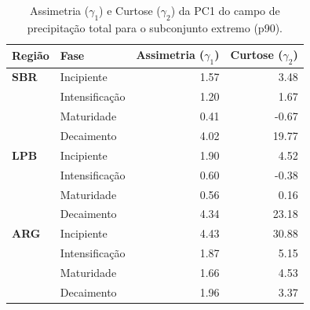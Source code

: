 \begin{table}[htbp]
\centering
\caption[Momentos estatísticos da PC1 de precipitação --- Subconjunto p90]{Assimetria ($\gamma_1$) e Curtose ($\gamma_2$) da PC1 do campo de precipitação total para o subconjunto extremo (p90).}
\label{tab:momentos_p90_tp}
\begin{tabular*}{\textwidth}{@{\extracolsep{\fill}}llrr}
\hline
\textbf{Região} & \textbf{Fase} & \textbf{Assimetria ($\gamma_1$)} & \textbf{Curtose ($\gamma_2$)} \\
\hline
\textbf{SBR} & Incipiente & 1.57 & 3.48 \\
 & Intensificação & 1.20 & 1.67 \\
 & Maturidade & 0.41 & -0.67 \\
 & Decaimento & 4.02 & 19.77 \\
\hline
\textbf{LPB} & Incipiente & 1.90 & 4.52 \\
 & Intensificação & 0.60 & -0.38 \\
 & Maturidade & 0.56 & 0.16 \\
 & Decaimento & 4.34 & 23.18 \\
\hline
\textbf{ARG} & Incipiente & 4.43 & 30.88 \\
 & Intensificação & 1.87 & 5.15 \\
 & Maturidade & 1.66 & 4.53 \\
 & Decaimento & 1.96 & 3.37 \\
\hline
\end{tabular*}
\end{table}